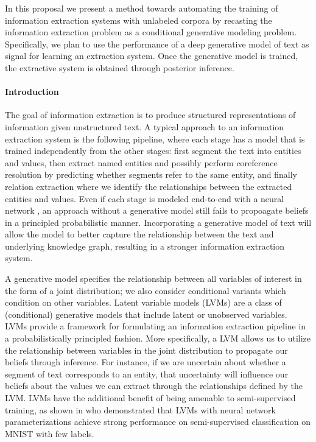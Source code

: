 \documentclass[12pt]{article}
\begin{document}
In this proposal we present a method towards automating the
training of information extraction systems with unlabeled corpora
by recasting the information extraction problem as a conditional generative modeling problem.
Specifically, we plan to use the performance of a deep generative model of text 
as signal for learning an extraction system.
Once the generative model is trained, the extractive system is obtained through posterior inference.

\paragraph{Introduction}
The goal of information extraction is to produce structured representations of information
given unstructured text.
A typical approach to an information extraction system is the following pipeline,
where each stage has a model that is trained independently from the other stages:
first segment the text into entities and values,
then extract named entities and possibly perform
coreference resolution by predicting whether segments refer to the same entity, 
and finally relation extraction where we identify the relationships between the extracted
entities and values.
Even if each stage is modeled end-to-end with a neural network \citep{miwa2016e2ere},
an approach without a generative model still fails to propoagate beliefs
in a principled probabilistic manner.
Incorporating a generative model of text will allow the model to better capture
the relationship between the text and underlying knowledge graph,
resulting in a stronger information extraction system.

A generative model specifies the relationship between all variables of interest in
the form of a joint distribution; we also consider conditional variants
which condition on other variables.
Latent variable models (LVMs) are a class of (conditional) generative models
that include latent or unobserved variables.
LVMs provide a framework for formulating an information extraction pipeline
in a probabilistically principled fashion.
More specifically, a LVM allows us to utilize the relationship between
variables in the joint distribution to propagate our beliefs through inference.
For instance, if we are uncertain about whether a segment of text corresponds
to an entity, that uncertainty will influence our beliefs about the values we can extract
through the relationships defined by the LVM.
LVMs have the additional benefit of being amenable to semi-supervised training,
as shown in \citet{kingma2014ssvae} who demonstrated that
LVMs with neural network parameterizations achieve strong performance on
semi-supervised classification on MNIST with few labels.
\end{document}

